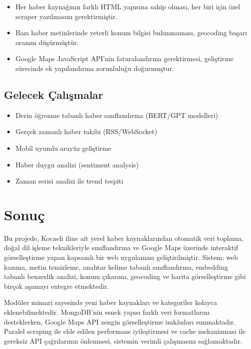 \documentclass[conference]{IEEEtran}
\begin{document}
\begin{itemize}
    \item Her haber kaynağının farklı HTML yapısına sahip olması, her biri için özel scraper yazılmasını gerektirmiştir.
    \item Bazı haber metinlerinde yeterli konum bilgisi bulunmaması, geocoding başarı oranını düşürmüştür.
    \item Google Maps JavaScript API'nin faturalandırma gerektirmesi, geliştirme sürecinde ek yapılandırma zorunluluğu doğurmuştur.
\end{itemize}

\subsection{Gelecek Çalışmalar}

\begin{itemize}
    \item Derin öğrenme tabanlı haber sınıflandırma (BERT/GPT modelleri)
    \item Gerçek zamanlı haber takibi (RSS/WebSocket)
    \item Mobil uyumlu arayüz geliştirme
    \item Haber duygu analizi (sentiment analysis)
    \item Zaman serisi analizi ile trend tespiti
\end{itemize}

\section{Sonuç}

Bu projede, Kocaeli iline ait yerel haber kaynaklarından otomatik veri toplama, doğal dil işleme teknikleriyle sınıflandırma ve Google Maps üzerinde interaktif görselleştirme yapan kapsamlı bir web uygulaması geliştirilmiştir. Sistem; web kazıma, metin temizleme, anahtar kelime tabanlı sınıflandırma, embedding tabanlı benzerlik analizi, konum çıkarımı, geocoding ve harita görselleştirme gibi birçok aşamayı entegre etmektedir.

Modüler mimari sayesinde yeni haber kaynakları ve kategoriler kolayca eklenebilmektedir. MongoDB'nin esnek yapısı farklı veri formatlarını desteklerken, Google Maps API zengin görselleştirme imkânları sunmaktadır. Paralel scraping ile elde edilen performans iyileştirmesi ve cache mekanizması ile gereksiz API çağrılarının önlenmesi, sistemin verimli çalışmasını sağlamaktadır.
\end{document}
